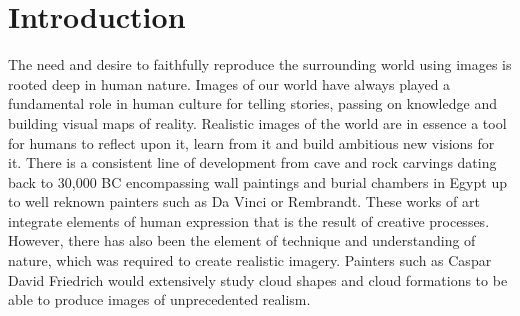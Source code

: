 \chapter{Introduction}
\label{sec:introduction}



The need and desire to faithfully reproduce the surrounding world using images is rooted deep in human nature. Images of our world have always played a fundamental role in human culture for telling stories, passing on knowledge and building visual maps of reality. Realistic images of the world are in essence a tool for humans to reflect upon it, learn from it and build ambitious new visions for it. There is a consistent line of development from cave and rock carvings dating back to 30,000 BC encompassing wall paintings and burial chambers in Egypt up to well reknown painters such as Da Vinci or Rembrandt. These works of art integrate elements of human expression that is the result of creative processes. However, there has also been the element of technique and understanding of nature, which was required to create realistic imagery. Painters such as Caspar David Friedrich would extensively study cloud shapes and cloud formations to be able to produce images of unprecedented realism.

